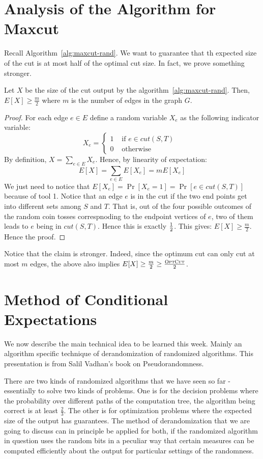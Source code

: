 \section{Analysis of the Algorithm for {\sc Maxcut}}
Recall Algorithm~\ref{alg:maxcut-rand}. We want to guarantee that th expected size of the cut is at most half of the optimal cut size. In fact, we prove something stronger.
\begin{claim}
Let $X$ be the size of the cut output by the algorithm~\ref{alg:maxcut-rand}. Then, $E[X] \ge \frac{m}{2}$ where $m$ is the number of edges in the graph $G$.
\end{claim}
\begin{proof}
For each edge $e \in E$ define a random variable $X_e$ as the following indicator variable:
$$ X_e = \begin{cases} 1 & \textrm{ if $e \in cut(S,T)$ } \\
0 & \textrm{ otherwise } \end{cases} $$
By definition, $X = \sum_{e \in E} X_e$. Hence, by linearity of expectation:
$$E[X] = \sum_{e \in E} E[X_e] = m E[X_e]$$
We just need to notice that $E[X_e] = \Pr[X_e = 1] = \Pr[e \in cut(S,T)]$ because of tool 1. Notice that an edge $e$ is in the cut if the two end points get into different sets among $S$ and $T$. That is, out of the four possible outcomes of the random coin tosses correspnoding to the endpoint vertices of $e$, two of them leads to $e$ being in $cut(S,T)$. Hence this is exactly $\frac{1}{2}$. This gives:
$E[X] \ge \frac{m}{2}$. Hence the proof.
\end{proof}
Notice that the claim is stronger. Indeed, since the optimum cut can only cut at most $m$ edges, the above also implies $E[X] \ge \frac{m}{2} \ge \frac{\textrm{\sc OptCut}}{2}$.

\section{Method of Conditional Expectations}

We now describe the main technical idea to be learned this week. Mainly an algorithm specific technique of derandomization of randomized algorithms. This presentation is from Salil Vadhan's book on Pseudorandomness.

There are two kinds of randomized algorithms that we have seen so far - essentially to solve two kinds of problems. One is for the decision problems where the probability over different paths of the  computation tree, the algorithm being correct is at least $\frac{2}{3}$. The other is for optimization problems where the expected size of the output has guarantees. The method of derandomization that we are going to discuss can in principle be applied for both, if the randomized algorithm in question uses the random bits in a peculiar way that certain measures can be computed efficiently about the output for particular settings of the randomness. \\[-8mm]

